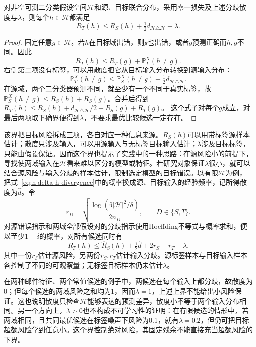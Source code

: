 \begin{theorem}[领域自适应的目标域期望风险界]
\label{thm:domain-adaptation-bound}
对非空可测二分类假设空间$\mathcal H$和源、目标联合分布，采用零一损失及上述分歧散度与$\lambda$，则每个$h\in\mathcal H$都满足
\begin{equation}
 R_T(h)\leq R_S(h)+\tfrac12d_{\mathcal H\triangle\mathcal H}+\lambda.
 \label{eq:domain-adaptation-risk-bound}
\end{equation}
\end{theorem}
\begin{proof}
固定任意$g\in\mathcal H$。若$h$在目标域出错，则$g$也出错，或者$g$预测正确而$h,g$不同。因此
\[
 R_T(h)\leq R_T(g)+\mathbb P_T^X(h\neq g).
\]
右侧第二项没有标签，可以用散度把它从目标输入分布转换到源输入分布：
\[
 \mathbb P_T^X(h\neq g)
 \leq\mathbb P_S^X(h\neq g)+\tfrac12d_{\mathcal H\triangle\mathcal H}.
\]
在源域，两个二分类器预测不同，就至少有一个不同于真实标签，故
$\mathbb P_S^X(h\neq g)\leq R_S(h)+R_S(g)$。合并后得到
$R_T(h)\leq R_S(h)+d_{\mathcal H\triangle\mathcal H}/2+R_S(g)+R_T(g)$。
这个式子对每个$g$成立，对最后两项取下确界便得到$\lambda$，不要求最优比较候选一定存在。
\end{proof}

该界把目标风险拆成三项，各自对应一种信息来源。$R_S(h)$可以用带标签源样本估计；散度只涉及输入，可以用源输入与无标签目标输入估计；$\lambda$涉及目标标签，只能由假设保证。因而这个界也提示了实践中的一种思路：在源风险小的前提下，寻找使两域输入在$\mathcal H$看来难以区分的模型或特征。若研究对象保证$\lambda$很小，就可以结合源风险与输入分歧的样本估计，限制选定模型的目标错误。以有限$\mathcal H$为例，把式~\eqref{eq:h-delta-h-divergence}中的概率换成源、目标输入的经验频率，记所得散度为$\widehat d$。令
\[
 r_D=\sqrt{\frac{\log(6|\mathcal H|^2/\delta)}{2n_D}},\qquad D\in\{S,T\}.
\]
对源错误指示和两域全部假设对的分歧指示使用Hoeffding不等式与概率求和，便以至少$1-\delta$的概率，对所有候选同时有
\[
 R_T(h)\leq\widehat R_S(h)+\tfrac12\widehat d+2r_S+r_T+\lambda.
\]
其中一份$r_S$估计源风险，另两份$r_S,r_T$估计输入分歧。源标签样本与目标输入样本各控制了不同的可观察量；无标签目标样本仍未估计$\lambda$。

在两种邮件特征、两个常值候选的例子中，两候选在每个输入上都分歧，故散度为0；但每个候选的两域风险之和均为1，因而$\lambda=1$，上述上界不能给出小风险保证。这也说明散度只检查$\mathcal H$能够表达的预测差异，散度小不等于两个输入分布相同。另一个方向上，$\lambda>0$也不构成不可学习性的证明：在有限候选的情形中，若两域相同，且共同最优候选在标签噪声下风险为0.1，就有$\lambda=0.2$，但仍可把目标超额风险学到任意小。这个界控制绝对风险，其固定残余不能直接充当超额风险的下界。

